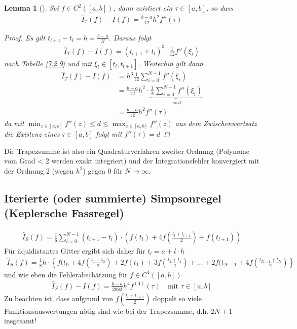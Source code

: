 \documentclass[ngerman,fontsize=11pt, paper=a4, parskip=half, titlepage=true, toc=bib]{scrbook}
\theoremstyle{definition}
\theoremstyle{plain}
\newtheorem{Lem}[Def]{Lemma}		%
\newcommand{\subsectione}[1]{\addtocounter{Def}{1}\subsection{#1}}
\newenvironment{Leme}[1][]{ %
  \begin{Lem}[#1] }
  {\end{Lem}
  \addtocounter{subsection}{1}}
\begin{document}
\begin{Leme}\label{7.2.11}
  Sei $f\in C^2([a,b])$, dann existiert ein $\tau \in[a,b]$, so dass
  \begin{gather}
    \hat{I}_T(f) -I(f) = \frac{b-a}{12}h^2 f''(\tau) %
    \label{VII.2.12}
  \end{gather}

  \begin{proof}
    Es gilt $t_{l+1}-t_l = h= \frac{b-a}{N}$.
    Daraus folgt
    \begin{gather*}
      \hat{I}_T(f)-I(f)=(t_{l+1}+t_l)^3\cdot\frac{1}{12}f''(\xi_l)
    \end{gather*}
    nach Tabelle \ref{7.2.9} und mit
    $\xi_l\in[t_l,t_{l+1}]$.
    Weiterhin gilt dann
    \begin{align*}
      \hat{I}_T(f) - I(f) &= h^3\frac{1}{12}\sum_{i=0}^{N-1}f''(\xi_i)\\
                          &= \frac{b-a}{12}h^2 \cdot \underbrace{
                            \frac{1}{N}\sum_{i=0}^{N-1}f''(\xi_i)
                            }_{\coloneqq d}\\
                          &= \frac{b-a}{12}h^2 f''(\tau)
    \end{align*}
    da mit $\min_{z\in[a,b]} f''(z) \leq d \leq \max_{z\in[a,b]}f''(z)$
    aus dem Zwischenwertsatz die Existenz eines $\tau\in[a,b]$ folgt
    mit $f''(\tau) = d$
  \end{proof}
\end{Leme}

Die Trapezsumme ist also ein
Quadraturverfahren zweiter Ordnung
(Polynome vom Grad < 2 werden exakt integriert) und der
Integrationsfehler konvergiert mit der Ordnung 2 (wegen $h^2$) gegen 0
für $N\longrightarrow \infty$.

\subsectione{Iterierte (oder
  summierte) Simpsonregel
  (Keplersche Fassregel)}
\begin{gather}
  \hat{I}_S(f) = \frac{1}{6}\sum_{l=0}^{N-1} (t_{l+1}-t_l)
  \cdot \left(f(t_l) +4f(\frac{t_l+t_{l+1}}{2}) + f(t_{l+1})
  \right)
  \label{VII.2.13}
\end{gather}
Für äquidistantes Gitter ergibt sich daher für $t_l=a+l\cdot h$
\begin{gather}
  \hat{I}_S(f) = \frac{1}{8}h\cdot
  \left\{
    f(t_0+4f\left(\frac{t_1+t_0}{2}\right) 
    +2f(t_1) + 3f\left(\frac{t_2+t_1}{2}\right)
    + \ldots +2f(t_{N-1}
    +4f\left(\frac{t_{N-1}+t_N}{2}\right)
  \right\}
  \label{VII.2.14}
\end{gather}
und wie eben die Fehlerabschätzung
für $f\in C^4([a,b])$
\begin{gather}
  \hat{I}_S(f) -I(f) =
  \frac{b-a}{2880}h^4f^{(4)}(\tau)
  \quad \text{mit } \tau\in[a,b]
  \label{VII.2.15}
\end{gather}
Zu beachten ist, dass aufgrund von
$f\left(\frac{t_l+t_{l+1}}{2}\right)$
doppelt so viele Funktionsauswertungen nötig sind
wie bei der Trapezsumme, d.h. $2N+1$ insgesamt!
\end{document}
